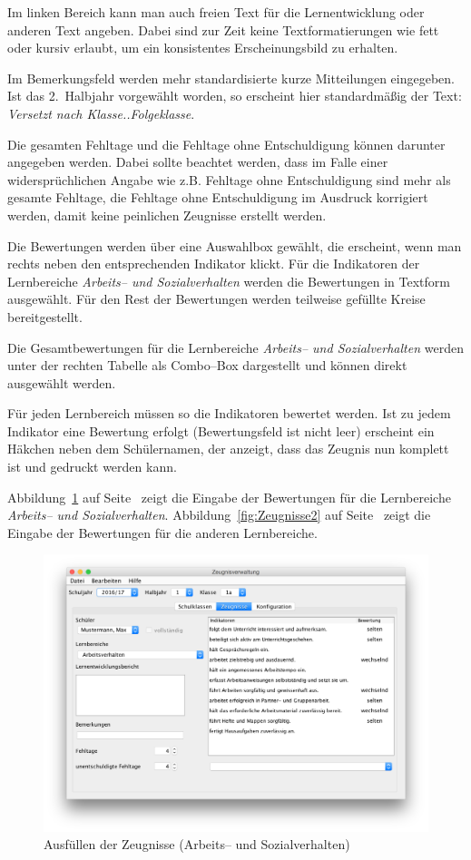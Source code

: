 \documentclass[a4paper,notitlepage,parskip]{scrartcl}
\newcommand\ott{\normalfont\ttfamily}
\begin{document}
Im linken Bereich kann man auch freien Text für die Lernentwicklung oder anderen Text angeben. Dabei sind zur Zeit keine Textformatierungen wie fett oder kursiv erlaubt, um ein konsistentes Erscheinungsbild zu erhalten.

Im Bemerkungsfeld werden mehr standardisierte kurze Mitteilungen eingegeben.
Ist das 2.~Halbjahr vorgewählt worden, so erscheint hier standardmäßig der Text: \emph{Versetzt nach Klasse..{\ott Folgeklasse}}.

Die gesamten Fehltage und die Fehltage ohne Entschuldigung können darunter angegeben werden.
Dabei sollte beachtet werden, dass im Falle einer widersprüchlichen Angabe wie z.B. Fehltage ohne Entschuldigung sind mehr als gesamte Fehltage, die Fehltage ohne Entschuldigung im Ausdruck korrigiert werden, damit keine peinlichen Zeugnisse erstellt werden. 

Die Bewertungen werden über eine Auswahlbox gewählt, die erscheint, wenn man rechts neben den entsprechenden Indikator klickt. Für die Indikatoren der Lernbereiche \emph{Arbeits-- und Sozialverhalten} werden die Bewertungen in Textform ausgewählt. Für den Rest der Bewertungen werden teilweise gefüllte Kreise bereitgestellt.

Die Gesamtbewertungen für die Lernbereiche \emph{Arbeits-- und Sozialverhalten} werden unter der rechten Tabelle als Combo--Box dargestellt und können direkt ausgewählt werden.

Für jeden Lernbereich müssen so die Indikatoren bewertet werden.
Ist zu jedem Indikator eine Bewertung erfolgt (Bewertungsfeld ist nicht leer) erscheint ein Häkchen neben dem Schülernamen, der anzeigt, dass das Zeugnis nun komplett ist und gedruckt werden kann.

Abbildung~\ref{fig:Zeugnisse} auf Seite~\pageref{fig:Zeugnisse} zeigt die Eingabe der Bewertungen für die Lernbereiche \emph{Arbeits-- und Sozialverhalten}.
Abbildung~\ref{fig:Zeugnisse2} auf Seite~\pageref{fig:Zeugnisse2} zeigt die Eingabe der Bewertungen für die anderen Lernbereiche.

\begin{figure}[ht]
\centering
\centerline{\includegraphics[width=1.0\textwidth]{Zeugnisse}}
\caption{Ausfüllen der Zeugnisse (Arbeits-- und Sozialverhalten)}
\label{fig:Zeugnisse}
\end{figure}
\end{document}

